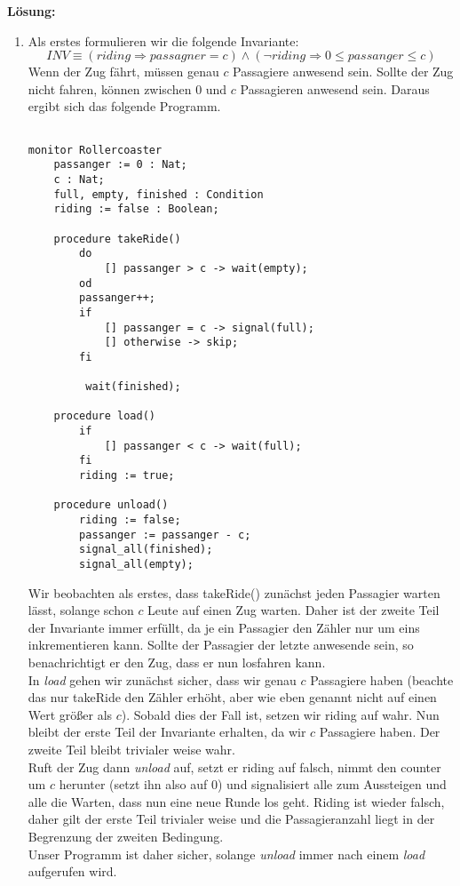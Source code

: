 \documentclass[ngerman,a4paper,11pt]{article}
\begin{document}
\textbf{Lösung:}\\
\begin{enumerate}[1.]
	\item
		Als erstes formulieren wir die folgende Invariante:
		$$
			INV \equiv (riding \Rightarrow passagner = c) \land (\neg riding \Rightarrow 0 \leq passanger \leq c)
		$$
		Wenn der Zug fährt, müssen genau $c$ Passagiere anwesend sein. Sollte der Zug nicht fahren, können zwischen 0 und $c$
		Passagieren anwesend sein. Daraus ergibt sich das folgende Programm.\\

	\begin{lstlisting}

monitor Rollercoaster
	passanger := 0 : Nat;
	c : Nat;
	full, empty, finished : Condition
	riding := false : Boolean;

	procedure takeRide()
		do 
			[] passanger > c -> wait(empty);
		od
		passanger++;
		if
			[] passanger = c -> signal(full);
			[] otherwise -> skip;
		fi

		 wait(finished);

	procedure load()
		if 
			[] passanger < c -> wait(full);
		fi
		riding := true;

	procedure unload()
		riding := false;
		passanger := passanger - c;
		signal_all(finished);
		signal_all(empty);
	\end{lstlisting}

	Wir beobachten als erstes, dass takeRide() zunächst jeden Passagier warten lässt, solange schon $c$ Leute auf einen Zug warten.
	Daher ist der zweite Teil der Invariante immer erfüllt, da je ein Passagier den Zähler nur um eins inkrementieren kann.
	Sollte der Passagier der letzte anwesende sein, so benachrichtigt er den Zug, dass er nun losfahren kann.\\
	In \emph{load} gehen wir zunächst sicher, dass wir genau $c$ Passagiere haben (beachte das nur takeRide den Zähler erhöht,
	aber wie eben genannt nicht auf einen Wert größer als $c$). Sobald dies der Fall ist, setzen wir riding auf wahr. Nun bleibt der
	erste Teil der Invariante erhalten, da wir $c$ Passagiere haben. Der zweite Teil bleibt trivialer weise wahr.\\
	Ruft der Zug dann \emph{unload} auf, setzt er riding auf falsch, nimmt den counter um $c$ herunter (setzt ihn also auf 0) und
	signalisiert alle zum Aussteigen und alle die Warten, dass nun eine neue Runde los geht. Riding ist wieder falsch, daher gilt 
	der erste Teil trivialer weise und die Passagieranzahl liegt in der Begrenzung der zweiten Bedingung.\\
	Unser Programm ist daher sicher, solange \emph{unload} immer nach einem \emph{load} aufgerufen wird.\\


\end{enumerate}
\end{document}
